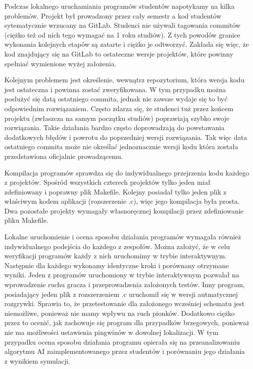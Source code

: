 Podczas lokalnego uruchamiania programów studentów napotykamy na kilka problemów.
Projekt był prowadzony przez cały semestr a kod studentów sytematycznie wrzucany na GitLab.
Studenci nie używali tagowania commitów (ciężko też od nich tego wymagać na 1 roku studiów).
Z tych powodów granice wykonania kolejnych etapów są zatarte i ciężko je odtworzyć.
Zakłada się więc, że kod znajdujący się na GitLab to ostateczne wersje projektów, które powinny spełniać wymienione wyżej założenia.

Kolejnym problemem jest określenie, wewnątrz repozytorium, która wersja kodu jest ostateczna i powinna zostać zweryfikowana.
W tym przypadku można posłużyć się datą ostatniego commita, jednak nie zawsze wydaje się to być odpowiednim rozwiązaniem.
Często zdarza się, że studenci tuż przez końcem projektu (zwłaszcza na samym początku studiów) poprawiają szybko swoje rozwiązania.
Takie działania bardzo często doprowadzają do powstawania dodatkowych błędów i powrotu do poprzedniej wersji rozwiązania.
Tak więc data ostatniego commita może nie określać jednoznacznie wersji kodu która została przedstawiona oficjalnie prowadzącemu.

Kompilacja programów sprawdza się do indywidualnego przejrzenia kodu każdego z projektów.
Spośród wszystkich czterech projektów tylko jeden miał zdefiniowany i poprawny plik Makefile.
Kolejny posiadał tylko jeden plik z właściwym kodem aplikacji (rozszerzenie .c), więc jego kompilacja była prosta.
Dwa pozostałe projekty wymagały własnoręcznej kompilacji przez zdefiniowanie pliku Makefile.

Lokalne uruchomienie i ocena sposobu działania programów wymagała również indywidualnego podejścia do każdego z zespołów.
Można założyć, że w celu weryfikacji programów każdy z nich uruchomimy w trybie interaktywnym.
Następnie dla każdego wykonamy identyczne kroki i porównany otrzymane wyniki.
Jeden z programów uruchomiony w trybie interaktywnym pozwalał na wprowadzenie ruchu gracza i przeprowadzenia założonych testów.
Inny program, posiadający jeden plik z rozszerzeniem .c uruchomił się w wersji autmatycznej rozgrywki.
Sprawia to, że przetestowanie dla założonego wcześniej schematu jest niemożliwe, ponieważ nie mamy wpływu na ruch pionków.
Dodatkowo ciężko przez to ocenić, jak zachowuje się program dla przypadków brzegowych, ponieważ nie ma możliwości ustawienia pingwinów w dowolnej lokalizacji.
W tym przypadku ocena sposobu działania programu opierała się na przeanalizowaniu algorytmu AI zaimplementowanego przez studentów i porównaniu jego działania z wynikiem symulacji.


